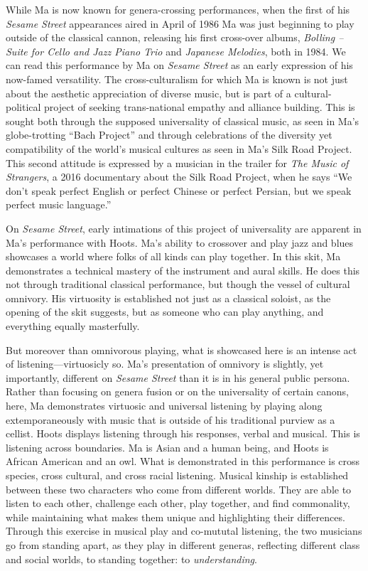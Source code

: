 \documentclass[12pt,letterpaper]{article}
\newcommand{\ses}{\textit{Sesame Street }}
\begin{document}
	While Ma is now known for genera-crossing performances, when the first
	of his \textit{Sesame Street} appearances aired in April of
	1986\autocite{2210} Ma was just beginning to play outside of the 
	classical cannon, releasing his first cross-over albums, 
	\textit{Bolling – Suite for Cello and Jazz Piano Trio} and 
	\textit{Japanese Melodies}, both in 1984.\autocite{MaSite} We can read 
	this performance by Ma on \textit{Sesame Street} as an early expression
	of his now-famed versatility. The cross-culturalism for which Ma is 
	known is not just about the aesthetic appreciation of diverse music, but
	is part of a cultural-political project of seeking trans-national 
	empathy and alliance building. This is sought both through the supposed 
	universality of classical music, as seen in Ma's globe-trotting 
	``Bach Project''\autocite{BachProject} and through celebrations of the 
	diversity yet compatibility of the world's musical cultures as seen in 
	Ma's Silk Road Project. This second attitude is expressed by a musician 
	in the trailer for \textit{The Music of Strangers}, a 2016 documentary 
	about the Silk Road Project, when he says ``We don't speak perfect 
	English or perfect Chinese or perfect Persian, but we speak perfect 
	music language.''\autocite{Strangers}

	On \textit{Sesame Street}, early intimations of this project of 
	universality are apparent in Ma's performance with Hoots. Ma's ability 
	to crossover and play jazz and blues showcases a world where folks of 
	all kinds can play together. In this skit, Ma demonstrates a technical 
	mastery of the instrument and
	aural skills. He does this not through traditional classical 
	performance,
	but though the vessel of cultural omnivory. His virtuosity is 
	established not just as a classical soloist, as the opening of the skit
	suggests, but as someone who can play anything, and everything equally 
	masterfully.

	But moreover than omnivorous playing, what is showcased here is an 
	intense
	act of listening---virtuosicly so. Ma's presentation of omnivory is 
	slightly, yet importantly, different on \ses than it is in his general
	public persona. Rather than focusing
	on genera fusion or on the universality of certain canons, here, Ma 
	demonstrates virtuosic and universal listening by playing 
	along extemporaneously with music that is outside of his traditional 
	purview as a 
	cellist. Hoots displays listening through his responses, verbal and 
	musical. This is listening across boundaries. Ma is Asian and a human 
	being, and Hoots is African American and an owl. What is demonstrated 
	in this performance is cross species, cross cultural, and cross racial 
	listening. Musical kinship is established between these two characters 
	who come from different worlds. They are able to listen to each other, 
	challenge each other, play together, and find commonality, while 
	maintaining what makes them unique and highlighting their differences. 
	Through this exercise in musical play and co-mututal listening, the two
	musicians go from standing apart, as they play in different generas, 
	reflecting different class and social worlds, to standing together: to 
	\textit{understanding}.
	
\end{document}

